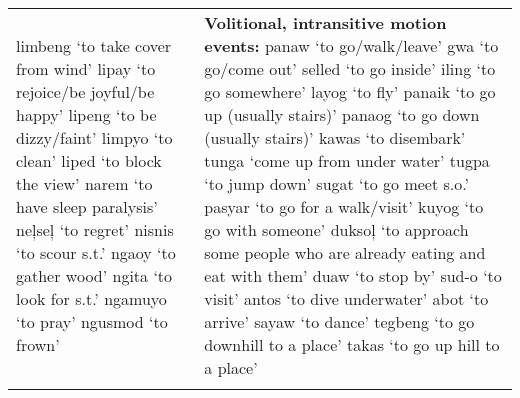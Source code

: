 \begin{table}
\begin{tabular} {
        >{\RaggedRight\arraybackslash}p{5.6cm}
        >{\RaggedRight\arraybackslash}p{5.6cm}
                    }
limbeng ‘to take cover from wind’\newline 
lipay ‘to rejoice/be joyful/be happy’\newline 
lipeng ‘to be dizzy/faint’\newline 
limpyo ‘to clean’\newline 
liped ‘to block the view’\newline 
narem ‘to have sleep paralysis’\newline 
neļseļ ‘to regret’\newline
nisnis ‘to scour s.t.’\newline 
ngaoy ‘to gather wood’\newline 
ngita ‘to  look for s.t.’\newline
ngamuyo ‘to pray'\newline
ngusmod ‘to frown’%
& \textbf{Volitional, intransitive motion events:}\newline
panaw ‘to go/walk/leave’\newline 
gwa ‘to go/come out’\newline 
selled ‘to go inside’\newline 
iling ‘to go somewhere’\newline 
layog ‘to fly’\newline 
panaik ‘to go up (usually stairs)’\newline 
panaog ‘to go down (usually stairs)’\newline 
kawas ‘to disembark’\newline 
tunga ‘come up from under water’\newline 
tugpa ‘to jump down’\newline 
sugat ‘to go meet s.o.’\newline 
pasyar ‘to go for a walk/visit’\newline 
kuyog ‘to go with someone’\newline 
duksoļ ‘to approach some people who are already eating and eat with them’\newline
duaw ‘to stop by’\newline 
sud-o ‘to visit’\newline 
antos ‘to dive underwater’\newline 
abot ‘to arrive’\newline 
sayaw ‘to dance’\newline
tegbeng ‘to go downhill to a place’\newline
takas ‘to go up hill to a place’\\ 
\lspbottomrule
\end{tabular}
\end{table}

